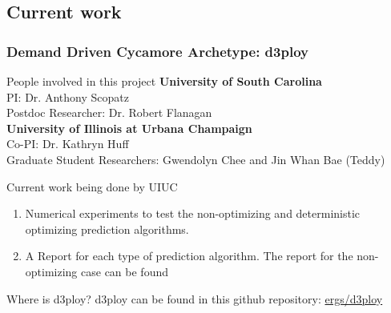\subsection{Current work}
\begin{frame}
  \frametitle{Demand Driven Cycamore Archetype: d3ploy}

\begin{block}{People involved in this project}
	\textbf{University of South Carolina}\\
	PI: Dr. Anthony Scopatz \\
	 Postdoc Researcher: Dr. Robert Flanagan \\
	\textbf{University of Illinois at Urbana Champaign} \\
	Co-PI: Dr. Kathryn Huff \\
	Graduate Student Researchers: Gwendolyn Chee and Jin Whan Bae (Teddy)
\end{block}

\begin{block}{Current work being done by UIUC}
	\begin{enumerate}
		\item Numerical experiments to test the non-optimizing and deterministic optimizing prediction algorithms. 
		\item A Report for each type of prediction algorithm. The report for the non-optimizing case can be found \cite{bae_numerical_2018}
	\end{enumerate}
\end{block}

\begin{block}{Where is d3ploy?}
	d3ploy can be found in this github repository: \href{https://github.com/ergs/d3ploy}{ergs/d3ploy} 
\end{block}


\end{frame}
